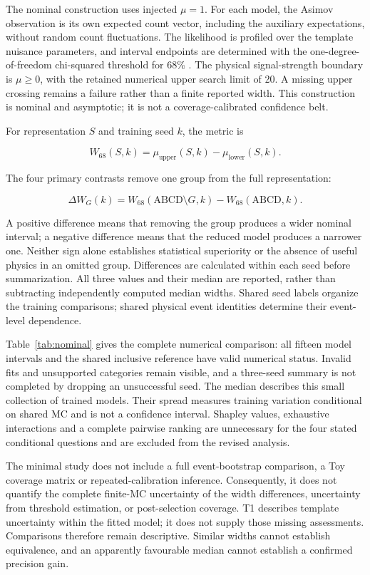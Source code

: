 \documentclass[aps,prd,reprint,superscriptaddress,nofootinbib,longbibliography,floatfix]{revtex4-2}
\begin{document}
The nominal construction uses injected \(\mu=1\). For each model, the Asimov observation is
its own expected count vector, including the auxiliary expectations, without random count
fluctuations. The likelihood is profiled over the template nuisance parameters, and interval
endpoints are determined with the one-degree-of-freedom chi-squared threshold for 68\%
\cite{Cowan2011}. The physical signal-strength boundary is \(\mu\geq0\), with the retained
numerical upper search limit of 20. A missing upper crossing remains a failure rather than a
finite reported width. This construction is nominal and asymptotic; it is not a
coverage-calibrated confidence belt.

For representation \(S\) and training seed \(k\), the metric is

\[
W_{68}(S,k)=\mu_{\mathrm{upper}}(S,k)-\mu_{\mathrm{lower}}(S,k).
\]

The four primary contrasts remove one group from the full representation:

\[
\Delta W_G(k)=W_{68}(\mathrm{ABCD}\setminus G,k)-W_{68}(\mathrm{ABCD},k).
\]

A positive difference means that removing the group produces a wider nominal interval; a
negative difference means that the reduced model produces a narrower one. Neither sign alone
establishes statistical superiority or the absence of useful physics in an omitted group.
Differences are calculated within each seed before summarization. All three values and their
median are reported, rather than subtracting independently computed median widths. Shared
seed labels organize the training comparisons; shared physical event identities determine
their event-level dependence.

Table~\ref{tab:nominal} gives the complete numerical comparison: all fifteen model intervals
and the shared inclusive reference have valid numerical status. Invalid fits and unsupported categories
remain visible, and a three-seed summary is not completed by dropping an unsuccessful seed.
The median describes this small collection of trained models. Their spread measures training
variation conditional on shared MC and is not a confidence interval. Shapley values,
exhaustive interactions and a complete pairwise ranking are unnecessary for the four stated
conditional questions and are excluded from the revised analysis.

The minimal study does not include a full event-bootstrap comparison, a Toy coverage matrix
or repeated-calibration inference. Consequently, it does not quantify the complete finite-MC
uncertainty of the width differences, uncertainty from threshold estimation, or
post-selection coverage. T1 describes template uncertainty within the fitted model; it does
not supply those missing assessments. Comparisons therefore remain descriptive. Similar
widths cannot establish equivalence, and an apparently favourable median cannot establish a
confirmed precision gain.
\end{document}
